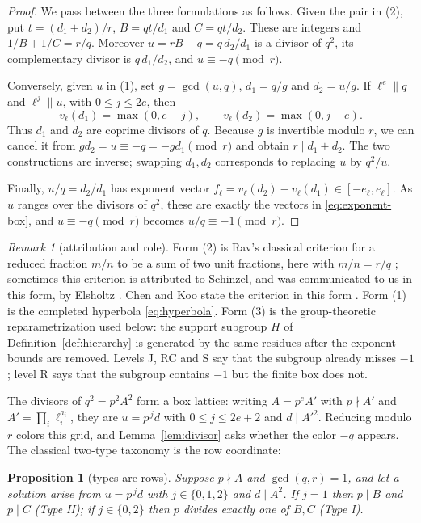\documentclass[11pt]{article}
\newtheorem{proposition}[theorem]{Proposition}
\theoremstyle{definition}
\theoremstyle{remark}
\newtheorem{remark}[theorem]{Remark}
\begin{document}
\begin{proof}
We pass between the three formulations as follows. Given the pair in (2), put
$t=(d_1+d_2)/r$, $B=qt/d_1$ and $C=qt/d_2$. These are integers and
$1/B+1/C=r/q$. Moreover
$u=rB-q=q\,d_2/d_1$ is a divisor of $q^2$, its complementary divisor is
$q\,d_1/d_2$, and $u\equiv-q\pmod r$.

Conversely, given $u$ in (1), set $g=\gcd(u,q)$, $d_1=q/g$ and $d_2=u/g$.
If $\ell^e\parallel q$ and $\ell^j\parallel u$, with $0\le j\le2e$, then
\[
v_\ell(d_1)=\max(0,e-j),\qquad
v_\ell(d_2)=\max(0,j-e).
\]
Thus $d_1$ and $d_2$ are coprime divisors of $q$. Because $g$ is invertible
modulo $r$, we can cancel it from $gd_2=u\equiv-q=-gd_1\pmod r$ and obtain
$r\mid d_1+d_2$. The two constructions are inverse; swapping $d_1,d_2$
corresponds to replacing $u$ by $q^2/u$.

Finally, $u/q=d_2/d_1$ has exponent vector
$f_\ell=v_\ell(d_2)-v_\ell(d_1)\in[-e_\ell,e_\ell]$. As $u$ ranges over
the divisors of $q^2$, these are exactly the vectors in \eqref{eq:exponent-box},
and $u\equiv-q\pmod r$ becomes $u/q\equiv-1\pmod r$.
\end{proof}

\begin{remark}[attribution and role]\label{rem:rav}
Form (2) is Rav's classical criterion for a reduced fraction $m/n$ to be a sum
of two unit fractions, here with $m/n=r/q$ \cite{Rav1966}; sometimes this criterion is
attributed to Schinzel, and was communicated to us in this form, by Elsholtz \cite{ElsholtzPC2026}.
Chen and Koo state the criterion in this form \cite{ChenKoo2013}. Form (1) is the completed hyperbola
\eqref{eq:hyperbola}. Form (3) is the group-theoretic reparametrization used
below: the support subgroup $H$ of Definition~\ref{def:hierarchy} is generated
by the same residues after the exponent bounds are removed. Levels J, RC and S
say that the subgroup already misses $-1$; level R says that the subgroup
contains $-1$ but the finite box does not.
\end{remark}

The divisors of $q^2 = p^2A^2$ form a box lattice: writing $A = p^{e}A'$ with
$p \nmid A'$ and $A' = \prod_i \ell_i^{a_i}$, they are $u = p^{\,j}d$ with
$0 \le j \le 2e+2$ and $d \mid A'^2$. Reducing modulo $r$ colors this grid, and
Lemma~\ref{lem:divisor} asks whether the color $-q$ appears. The classical two-type
taxonomy is the row coordinate:

\begin{proposition}[types are rows]\label{prop:types}
Suppose $p \nmid A$ and $\gcd(q,r) = 1$, and let a solution arise from
$u = p^{\,j}d$ with $j \in \{0,1,2\}$ and $d \mid A^2$. If $j = 1$ then $p \mid B$ and
$p \mid C$ \textup{(}Type II\textup{)}; if $j \in \{0,2\}$ then $p$ divides exactly one
of $B, C$ \textup{(}Type I\textup{)}.
\end{proposition}
\end{document}
